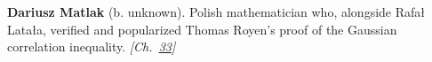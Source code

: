 \textbf{Dariusz Matlak} (b. unknown). Polish mathematician who, alongside Rafa\l{} Lata\l{}a, verified and popularized Thomas Royen's proof of the Gaussian correlation inequality. \emph{[Ch.~\hyperref[ch:incubationinequality]{33}]}

